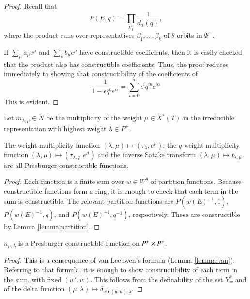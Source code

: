 \begin{proof} 
Recall that
\[
P(E,q) = \prod_{\Sigma_1^+} \frac{1}{d_\alpha(q)},
\]
where the product runs over representatives $\beta_1,\ldots,\beta_k$
of $\theta$-orbits in $\Psi^+$.

If $\sum_\mu a_\mu e^\mu$ and $\sum_\mu b_\mu e^\mu$ have
constructible coefficients, then it is easily checked that the product
also has constructible coefficients.  Thus, the proof reduces
immediately to showing that constructibility of the coefficients of
\[
\frac{1}{1-\epsilon q^b e^\alpha} 
= \sum_{i=0}^\infty \epsilon^i q^{i b} e^{i\alpha}
\]
This is evident.
\end{proof}

Let $m_{\lambda,\mu}\in \ring{N}$ be the multiplicity of the weight
$\mu\in X^*(T)$ in the irreducible representation with highest weight
$\lambda\in P^+$.

\begin{lemma}  
  The weight multiplicity function $(\lambda,\mu)\mapsto
  (\tau_\lambda,e^\mu)$, the $q$-weight multiplicity function
  $(\lambda,\mu)\mapsto (\tau_{\lambda,q},e^\mu)$ and the inverse
  Satake transform $(\lambda,\mu)\mapsto t_{\lambda,\mu}$ are all
  Presburger constructible functions.
\end{lemma}

\begin{proof} 
  Each function is a finite sum over $w\in W^\theta$ of partition
  functions.  Because constructible functions form a ring, it is
  enough to check that each term in the sum is constructible.  The
  relevant partition functions are $P(w(E)^{-1},1)$, $P(w(E)^{-1},q)$,
  and $P(w(E)^{-1},q^{-1})$, respectively.  These are constructible by
  Lemma \ref{lemma:partition}.
\end{proof}

\begin{theorem}\label{lemma:van-leeuwen} 
  $n_{\mu,\lambda}$ is a Presburger constructible function on
  $P^+\times P^+$.
\end{theorem}

\begin{proof} 
  This is a consequence of van Leeuwen's formula (Lemma
  \ref{lemma:van}).  Referring to that formula, it is enough to show
  constructibility of each term in the sum, with fixed $(w',w)$.  This
  follows from the definability of the set $Y^*_w$ and of the delta
  function $(\mu,\lambda)\mapsto \delta_{w\bullet (w'\mu),\lambda}$.
\end{proof}

